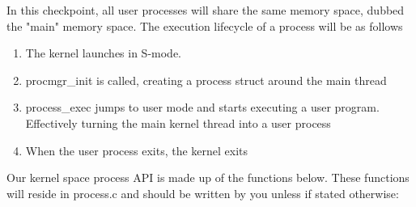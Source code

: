 \documentclass{article}
\begin{document}
	In this checkpoint, all user processes will share the same memory space, dubbed the "main" memory space. The execution lifecycle of a process will be as follows
	
	\begin{enumerate}\item
	    The kernel launches in S-mode.
    \item {\fix procmgr\_init} is called, creating a process struct around the main thread
    \item {\fix process\_exec} jumps to user mode and starts executing a user program. Effectively turning
    the main kernel thread into a user process
    \item When the user process exits, the kernel exits 
	\end{enumerate}
	
	Our kernel space process API is made up of the functions below. These functions will reside in {\fix process.c} 
	and should be written by you unless if stated otherwise:
	
\end{document}
